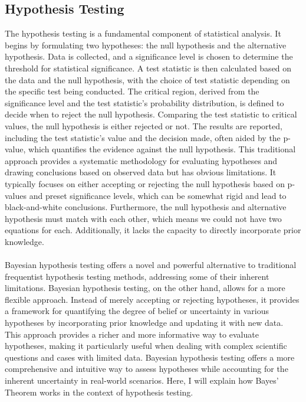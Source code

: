 \documentclass{article}
\begin{document}
\subsection{Hypothesis Testing}
The hypothesis testing is a fundamental component of statistical analysis. It begins by formulating two hypotheses: the null hypothesis and the alternative hypothesis. Data is collected, and a significance level is chosen to determine the threshold for statistical significance. A test statistic is then calculated based on the data and the null hypothesis, with the choice of test statistic depending on the specific test being conducted. The critical region, derived from the significance level and the test statistic's probability distribution, is defined to decide when to reject the null hypothesis. Comparing the test statistic to critical values, the null hypothesis is either rejected or not. The results are reported, including the test statistic's value and the decision made, often aided by the p-value, which quantifies the evidence against the null hypothesis. This traditional approach provides a systematic methodology for evaluating hypotheses and drawing conclusions based on observed data but has obvious limitations. It typically focuses on either accepting or rejecting the null hypothesis based on p-values and preset significance levels, which can be somewhat rigid and lead to black-and-white conclusions. Furthermore, the null hypothesis and alternative hypothesis must match with each other, which means we could not have two equations for each. Additionally, it lacks the capacity to directly incorporate prior knowledge.\\\\
Bayesian hypothesis testing offers a novel and powerful alternative to traditional frequentist hypothesis testing methods, addressing some of their inherent limitations.  Bayesian hypothesis testing, on the other hand, allows for a more flexible approach. Instead of merely accepting or rejecting hypotheses, it provides a framework for quantifying the degree of belief or uncertainty in various hypotheses by incorporating prior knowledge and updating it with new data. This approach provides a richer and more informative way to evaluate hypotheses, making it particularly useful when dealing with complex scientific questions and cases with limited data. Bayesian hypothesis testing offers a more comprehensive and intuitive way to assess hypotheses while accounting for the inherent uncertainty in real-world scenarios. Here, I will explain how Bayes' Theorem works in the context of hypothesis testing.
\end{document}
